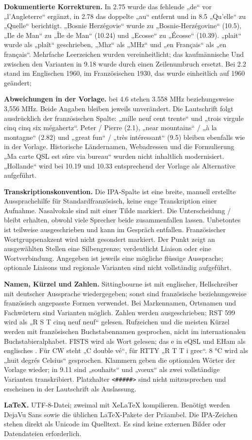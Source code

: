 \documentclass[a4paper,landscape,10pt]{article}
\newcommand{\ipa}[1]{{\ipafont[#1]}}
\begin{document}
\medskip
\textbf{Dokumentierte Korrekturen.} In 2.75 wurde das fehlende „de“ vor „l’Angleterre“ ergänzt,
in 2.78 das doppelte „au“ entfernt und in 8.5 „Qu'elle“ zu „Quelle“ berichtigt.
„Bosnie Herzégovie“ wurde zu „Bosnie-Herzégovine“ (10.5), „Ile de Man“ zu „Île de Man“ (10.24)
und „Ecosse“ zu „Écosse“ (10.39). „plait“ wurde als „plaît“ geschrieben, „Mhz“ als „MHz“
und „en Français“ als „en français“. Mehrfache Leerzeichen wurden vereinheitlicht;
das kaufmännische Und zwischen den Varianten in 9.18 wurde durch einen Zeilenumbruch ersetzt.
Bei 2.2 stand im Englischen 1960, im Französischen 1930, das wurde einheitlich auf 1960 geändert;

\medskip
\textbf{Abweichungen in der Vorlage.} bei 4.6 stehen 3.558 MHz beziehungsweise 3,556 MHz. Beide Angaben bleiben jeweils unverändert.
Die Lautschrift folgt ausdrücklich der französischen Spalte: „mille neuf cent trente“ und
„trois virgule cinq cinq six mégahertz“. Peter / Pierre (2.1), „near mountains“ / „à la montagne“ (2.82)
und „great fun“ / „très intéressant“ (9.5) bleiben ebenfalls wie in der Vorlage.
Historische Ländernamen, Webadressen und die Formulierung „Ma carte QSL est sûre via bureau“
wurden nicht inhaltlich modernisiert. „Hollande“ wird bei 10.19 und 10.33 entsprechend der Vorlage als Alternative aufgeführt.

\medskip
\textbf{Transkriptionskonvention.} Die IPA-Spalte ist eine breite, manuell erstellte Aussprachehilfe
für Standardfranzösisch, keine enge Transkription einer Aufnahme. Nasalvokale sind mit einer Tilde markiert.
Die Unterscheidung \ipa{œ̃} / \ipa{ɛ̃} bleibt erhalten, obwohl viele Sprecher beide zusammenfallen lassen.
Unbetontes \ipa{ə} ist teilweise ausgeschrieben und kann im Gespräch entfallen. Französischer Wortgruppenakzent
wird nicht gesondert markiert. Der Punkt zeigt an ausgewählten Stellen eine Silbengrenze;
\ipa{‿} verdeutlicht Liaison oder eine Wortverbindung. Angegeben ist jeweils eine mögliche flüssige Aussprache;
optionale Liaisons und regionale Varianten sind nicht vollständig aufgeführt.

\medskip
\textbf{Namen, Kürzel und Zahlen.} Sittingbourne ist mit englischer, Hellschreiber mit deutscher Aussprache
wiedergegeben; sonst sind französische beziehungsweise französisch angepasste Formen verwendet.
Bei Markennamen, Ortsnamen und Fachwörtern sind Varianten möglich. Zahlen werden ausgeschrieben;
RST 599 wird als „R S T cinq neuf neuf“ gelesen. Rufzeichen und die meisten Kürzel werden mit französischen
Buchstabennamen gesprochen, nicht im internationalen Buchstabieralphabet. FISTS wird als Wort gelesen;
das e in eQSL und EHam als englisches \ipa{i}. Für CW steht „C double vé“, für RTTY „R T T i grec“.
8 °C wird als „huit degrés Celsius“ gesprochen. Klammern geben die optionalen Wörter der Vorlage wieder;
in 9.11 sind „souhaits“ und „vœux“ als zwei vollständige Varianten transkribiert.
Platzhalter \texttt{<\#\#\#\#\#>} sind nicht mitzusprechen und erscheinen in der Lautschrift als Auslassung.

\medskip
\textbf{LaTeX.} UTF-8-Datei; zweimal mit XeLaTeX kompilieren. Benötigt werden DejaVu Sans sowie die
üblichen LaTeX-Pakete der Präambel. Die IPA-Zeichen stehen direkt als Unicode im Quelltext.
Es sind keine externen Bilder oder Datendateien erforderlich.
\end{document}
